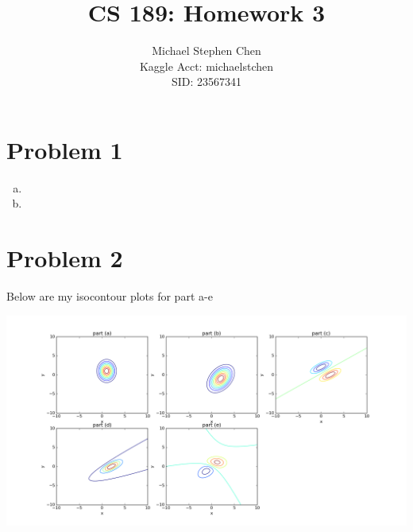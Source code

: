 \documentclass{article}
\title{CS 189: Homework 3}
\author{Michael Stephen Chen\\ Kaggle Acct: michaelstchen \\SID: 23567341}
\begin{document}
\maketitle

\pagebreak

\section*{Problem 1}
\begin{enumerate}[a)]
  \item
  \item
\end{enumerate}

\section*{Problem 2}
Below are my isocontour plots for part a-e
\begin{center}
  \includegraphics[scale=0.4]{prob2}
\end{center}
\end{document}
